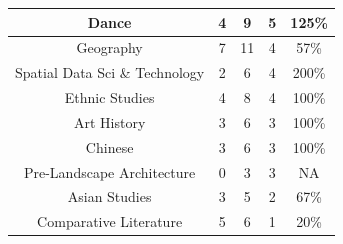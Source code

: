 \documentclass[10]{article}
\begin{document}
\begin{longtable}[c]{|ccccc|}
	\multicolumn{1}{|c|}{Dance}                                      & \multicolumn{1}{c|}{4}                               & \multicolumn{1}{c|}{9}                                   & \multicolumn{1}{c|}{5}                  & 125\%                 \\ \hline
	\multicolumn{1}{|c|}{Geography}                                  & \multicolumn{1}{c|}{7}                               & \multicolumn{1}{c|}{11}                                  & \multicolumn{1}{c|}{4}                  & 57\%                  \\ \hline
	\multicolumn{1}{|c|}{Spatial Data Sci \& Technology}             & \multicolumn{1}{c|}{2}                               & \multicolumn{1}{c|}{6}                                   & \multicolumn{1}{c|}{4}                  & 200\%                 \\ \hline
	\multicolumn{1}{|c|}{Ethnic Studies}                             & \multicolumn{1}{c|}{4}                               & \multicolumn{1}{c|}{8}                                   & \multicolumn{1}{c|}{4}                  & 100\%                 \\ \hline
	\multicolumn{1}{|c|}{Art History}                                & \multicolumn{1}{c|}{3}                               & \multicolumn{1}{c|}{6}                                   & \multicolumn{1}{c|}{3}                  & 100\%                 \\ \hline
	\multicolumn{1}{|c|}{Chinese}                                    & \multicolumn{1}{c|}{3}                               & \multicolumn{1}{c|}{6}                                   & \multicolumn{1}{c|}{3}                  & 100\%                 \\ \hline
	\multicolumn{1}{|c|}{Pre-Landscape Architecture}                 & \multicolumn{1}{c|}{0}                               & \multicolumn{1}{c|}{3}                                   & \multicolumn{1}{c|}{3}                  & NA                    \\ \hline
	\multicolumn{1}{|c|}{Asian Studies}                              & \multicolumn{1}{c|}{3}                               & \multicolumn{1}{c|}{5}                                   & \multicolumn{1}{c|}{2}                  & 67\%                  \\ \hline
	\multicolumn{1}{|c|}{Comparative Literature}                     & \multicolumn{1}{c|}{5}                               & \multicolumn{1}{c|}{6}                                   & \multicolumn{1}{c|}{1}                  & 20\%                  \\ \hline

\end{longtable}
\end{document}
